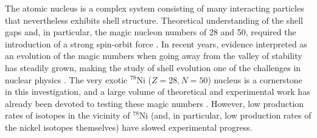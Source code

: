 \documentclass[reprint,superscriptaddress,amsmath,amssymb,aps,prl]{revtex4-1}
\begin{document}
\maketitle

The atomic nucleus is a complex system consisting of many interacting particles that nevertheless exhibits shell structure. Theoretical understanding of the shell gaps and, in particular, the magic nucleon numbers of 28 and 50, required the introduction of a strong spin-orbit force \cite{Mayer1949,Haxel1949}. In recent years, evidence interpreted as an evolution of the magic numbers when going away from the valley of stability has steadily grown, making the study of shell evolution one of the challenges in nuclear physics \cite{Otsuka2001,Sorlin2008}. The very exotic $^{78}$Ni ($Z=28, N=50$) nucleus is a cornerstone in this investigation, and a large volume of theoretical and experimental work has already been devoted to testing these magic numbers \cite{Otsuka2005,Sorlin2008,Hakala2008,Otsuka2010,Korgul2012,Marchi2014,Xu2014,Tsunoda2014,Coraggio2014,Sieja2012,Porquet2012,Hagen2016,Nowacki2016}. However, low production rates of isotopes in the vicinity of $^{78}$Ni (and, in particular, low production rates of the nickel isotopes themselves) have slowed experimental progress. 
\end{document}
